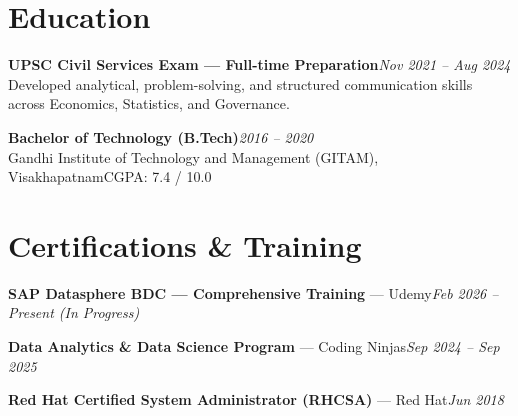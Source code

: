 \documentclass[10pt, letterpaper]{article}
\begin{document}
\section{Education}

{\bfseries UPSC Civil Services Exam — Full-time Preparation}\hfill{\small\color{muted}\textit{Nov 2021 -- Aug 2024}}\\
{\small\color{muted}Developed analytical, problem-solving, and structured communication skills across Economics, Statistics, and Governance.}

\vspace{2pt}
{\bfseries Bachelor of Technology (B.Tech)}\hfill{\small\color{muted}\textit{2016 -- 2020}}\\
{\small\color{muted}Gandhi Institute of Technology and Management (GITAM), Visakhapatnam\hfill CGPA: 7.4 / 10.0}

\section{Certifications \& Training}

{\bfseries SAP Datasphere BDC — Comprehensive Training} — Udemy\hfill{\small\color{muted}\textit{Feb 2026 -- Present \emph{(In Progress)}}}

\vspace{1pt}
{\bfseries Data Analytics \& Data Science Program} — Coding Ninjas\hfill{\small\color{muted}\textit{Sep 2024 -- Sep 2025}}

\vspace{1pt}
{\bfseries Red Hat Certified System Administrator (RHCSA)} — Red Hat\hfill{\small\color{muted}\textit{Jun 2018}}

\end{document}
